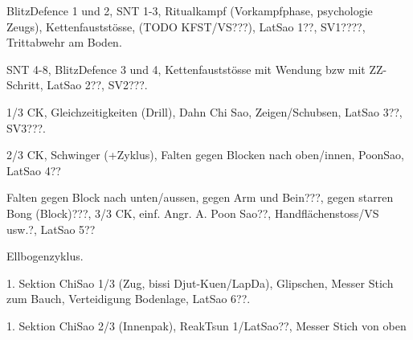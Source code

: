 \begin{WTGradSG}{1}

BlitzDefence 1 und 2, SNT 1-3, Ritualkampf (Vorkampfphase, psychologie Zeugs), Kettenfaustst\"osse, (TODO KFST/VS???), LatSao 1??, SV1????, Trittabwehr am Boden.

\end{WTGradSG}
\begin{WTGradSG}{2}

SNT 4-8, BlitzDefence 3 und 4, Kettenfaustst\"osse mit Wendung bzw mit ZZ-Schritt, LatSao 2??, SV2???.

\end{WTGradSG}
\begin{WTGradSG}{3}

1/3 CK, Gleichzeitigkeiten (Drill), Dahn Chi Sao, Zeigen/Schubsen, LatSao 3??, SV3???.

\end{WTGradSG}
\begin{WTGradSG}{4}

2/3 CK, Schwinger (+Zyklus), Falten gegen Blocken nach oben/innen, PoonSao, LatSao 4??

\end{WTGradSG}
\begin{WTGradSG}{5}

Falten gegen Block nach unten/aussen, gegen Arm und Bein???, gegen starren Bong (Block)???, 3/3 CK, einf. Angr. A. Poon Sao??, Handfl\"achenstoss/VS usw.?, LatSao 5??

Ellbogenzyklus.

\end{WTGradSG}
\begin{WTGradSG}{6}

1. Sektion ChiSao 1/3 (Zug, bissi Djut-Kuen/LapDa), Glipschen, Messer Stich zum Bauch, Verteidigung Bodenlage, LatSao 6??.

\end{WTGradSG}
\begin{WTGradSG}{7}

1. Sektion ChiSao 2/3 (Innenpak), ReakTsun 1/LatSao??, Messer Stich von oben

\end{WTGradSG}
